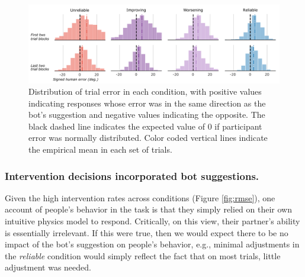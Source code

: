 \documentclass[10pt,letterpaper]{article}
\begin{document}
\begin{figure}[hbtp]
\vspace{-8mm}
\includegraphics[width=\textwidth]{img/error_distributions_clean.pdf} 
\vspace{-4mm}
\caption{Distribution of trial error in each condition, with positive values indicating responses whose error was in the same direction as the bot's suggestion and negative values indicating the opposite. The black dashed line indicates the expected value of 0 if participant error was normally distributed. Color coded vertical lines indicate the empirical mean in each set of trials.} 
\label{fig:error_histograms}
\end{figure}


\subsubsection{Intervention decisions incorporated bot suggestions.}

Given the high intervention rates across conditions (Figure \ref{fig:rmse}), one account of people's behavior in the task is that they simply relied on their own intuitive physics model to respond. Critically, on this view, their partner's ability is essentially irrelevant. If this were true, then we would expect there to be no impact of the bot's suggestion on people's behavior, e.g., minimal adjustments in the \textit{reliable} condition would simply reflect the fact that on most trials, little adjustment was needed. 
\end{document}
